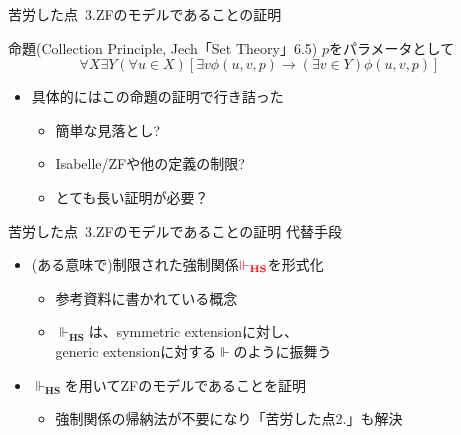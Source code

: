 \documentclass[17pt,aspectratio=169]{beamer}
\begin{document}
\begin{frame}{苦労した点\, {\normalsize 3.ZFのモデルであることの証明}}

    \begin{itembox}[l]{命題(Collection Principle, Jech「Set Theory」6.5)}
        {\small $p$をパラメータとして}
        \vspace{-10pt}
        $$\forall X \exists Y (\forall u \in X)[\exists v \phi(u, v, p) \rightarrow (\exists v \in Y) \phi(u, v, p)]$$
    \end{itembox}

    \vspace{-5pt}
    {\small
        \begin{itemize}[itemsep=8pt]
            \item 具体的にはこの命題の証明で行き詰った
                  \begin{itemize}
                      \item 簡単な見落とし?
                      \item Isabelle/ZFや他の定義の制限?
                      \item とても長い証明が必要？
                  \end{itemize}
        \end{itemize}
    }

\end{frame}

\begin{frame}{苦労した点\, {\normalsize 3.ZFのモデルであることの証明}}
    代替手段
    \vspace{-10pt}
    {\small
        \begin{itemize}[itemsep=8pt]
            \item (ある意味で)制限された強制関係$\textcolor{red}{\Vdash_{\mathbf{HS}}}$を形式化
                  \begin{itemize}
                      \item 参考資料に書かれている概念
                      \item $\Vdash_{\mathbf{HS}}$は、symmetric extensionに対し、\\
                            generic extensionに対する$\Vdash$のように振舞う
                  \end{itemize}
            \item $\Vdash_{\mathbf{HS}}$を用いてZFのモデルであることを証明
                  \begin{itemize}
                      \item 強制関係の帰納法が不要になり{\footnotesize「苦労した点2.」}も解決
                  \end{itemize}
        \end{itemize}
    }
\end{frame}
\end{document}
